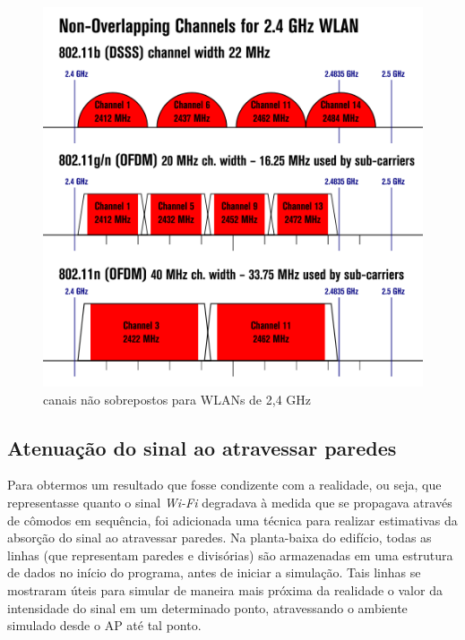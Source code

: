 \documentclass[
	12pt,				%
	openright,			%
	twoside,			%
	a4paper,			%
	english,			%
	french,				%
	spanish,			%
	brazil				%
	]{abntex2}
\begin{document}
\begin{figure}[htb]
	\caption{\label{canais} canais não sobrepostos para WLANs de 2,4 GHz}
	\begin{center}
		\includegraphics[scale=0.6]{images/canais.jpg}
	\end{center}
\end{figure}

\subsection[Atenuação do sinal ao atravessar paredes]{Atenuação do sinal ao atravessar paredes}

Para obtermos um resultado que fosse condizente com a realidade, ou seja, que representasse quanto o sinal \textit{Wi-Fi} degradava à medida que se propagava através de cômodos em sequência, foi adicionada uma técnica para realizar estimativas da absorção do sinal ao atravessar paredes. Na planta-baixa do edifício, todas as linhas (que representam paredes e divisórias) são armazenadas em uma estrutura de dados no início do programa, antes de iniciar a simulação. Tais linhas se mostraram úteis para simular de maneira mais próxima da realidade o valor da intensidade do sinal em um determinado ponto, atravessando o ambiente simulado desde o AP até tal ponto.
\end{document}
